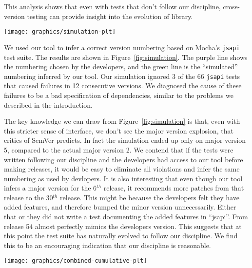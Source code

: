 This analysis shows that even with tests that don't follow our
discipline, cross-version testing can provide insight into the
evolution of library.

\begin{figure*}
\centering
\texttt{[image: graphics/simulation-plt]}
\caption{Simulation of version histories}%
\label{fig:simulation}
\end{figure*}

We used our tool to infer a correct version numbering based on Mocha's
{\tt jsapi} test suite. The results are shown in
Figure~\ref{fig:simulation}. The purple line shows the numbering
chosen by the developers, and the green line is the ``simulated''
numbering inferred by our tool.  Our simulation ignored 3 of the 66
{\tt jsapi} tests that caused failures in 12 consecutive versions. We
diagnosed the cause of these failures to be a bad specification of
dependencies, similar to the problems we described in the
introduction.

The key knowledge we can draw from Figure~\ref{fig:simulation} is
that, even with this stricter sense of interface, we don't see the
major version explosion, that critics\cite{crawford-not-semver,
  backbone-2888, exoplayer-1382} of SemVer predicts. In fact the
simulation ended up only on major version 5, compared to the actual
major version 2. We contend that if the tests were written following
our discipline and the developers had access to our tool before making
releases, it would be easy to eliminate all violations and infer the
same numbering as used by devlopers. It is also interesting that even
though our tool infers a major version for the 6$^{th}$ release, it
recommends more patches from that release to the 30$^{th}$
release. This might be because the developers felt they have added
features, and therefore bumped the minor version unnecessarily. Either
that or they did not write a test documenting the added features in
``jsapi''. From release 54 almost perfectly mimics the developers
version. This suggests that at this point the test suite has naturally
evolved to follow our discipline. We find this to be an encouraging
indication that our discipline is reasonable.

\begin{figure*}
\centering
\texttt{[image: graphics/combined-cumulative-plt]}
\caption{Cumulative names of violated tests} 
\label{fig:cumulative}
\end{figure*}

